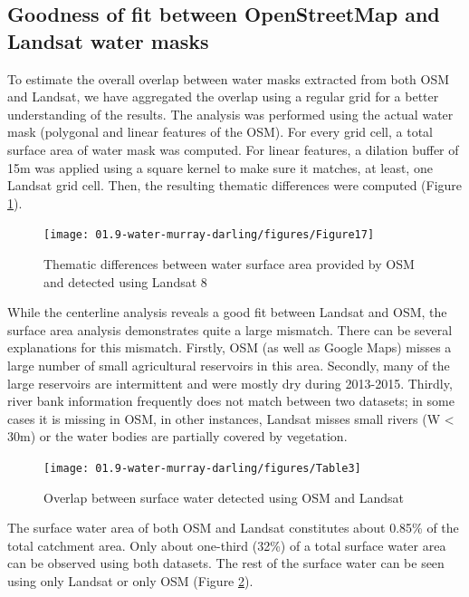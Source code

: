 \subsection{Goodness of fit between OpenStreetMap and Landsat water masks}
To estimate the overall overlap between water masks extracted from both OSM and Landsat, we have aggregated the overlap using a regular grid for a better understanding of the results. The analysis was performed using the actual water mask (polygonal and linear features of the OSM). For every grid cell, a total surface area of water mask was computed. For linear features, a dilation buffer of 15m was applied using a square kernel to make sure it matches, at least, one Landsat grid cell. Then, the resulting thematic differences were computed (Figure \ref{fig:au-positional-differences-thematic}).

\begin{figure}
	\centering
	\texttt{[image: 01.9-water-murray-darling/figures/Figure17]}
	\caption{Thematic differences between water surface area provided by OSM and detected using Landsat 8}
	\label{fig:au-positional-differences-thematic}
\end{figure}

While the centerline analysis reveals a good fit between Landsat and OSM, the surface area analysis demonstrates quite a large mismatch. There can be several explanations for this mismatch. Firstly, OSM (as well as Google Maps) misses a large number of small agricultural reservoirs in this area. Secondly, many of the large reservoirs are intermittent and were mostly dry during 2013-2015. Thirdly, river bank information frequently does not match between two datasets; in some cases it is missing in OSM, in other instances, Landsat misses small rivers (W < 30m) or the water bodies are partially covered by vegetation.

\begin{figure}
	\centering
	\texttt{[image: 01.9-water-murray-darling/figures/Table3]}
	\caption{Overlap between surface water detected using OSM and Landsat}
	\label{fig:final-overlap}
\end{figure}

The surface water area of both OSM and Landsat constitutes about 0.85\% of the total catchment area. Only about one-third (32\%) of a total surface water area can be observed using both datasets. The rest of the surface water can be seen using only Landsat or only OSM (Figure \ref{fig:final-overlap}).

